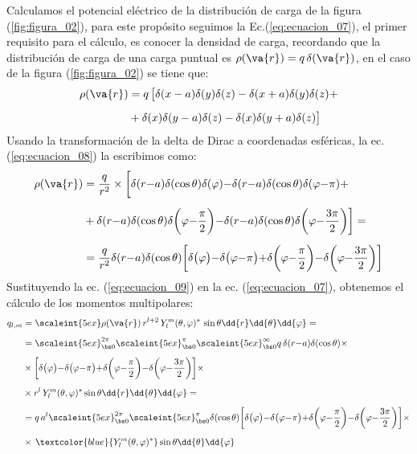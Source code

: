 Calculamos el potencial eléctrico de la distribución de carga de la figura (\ref{fig:figura_02}), para este propósito seguimos la Ec.(\ref{eq:ecuacion_07}), el primer requisito para el cálculo, es conocer la densidad de carga, recordando que la distribución de carga de una carga puntual es $\rho (\va{r}) = q \, \delta (\va{r})$, en el caso de la figura (\ref{fig:figura_02}) se tiene que:
\begin{align}
\rho(\va{r}) &= q \, \big[ \delta (x - a) \delta(y) \delta(z) -  \delta (x + a) \delta(y) \delta(z) + \\[0.5em]
&+ \delta (x) \delta(y - a) \delta(z) - \delta (x) \delta(y + a) \delta(z) \big]
\label{eq:ecuacion_08}
\end{align}
Usando la transformación de la delta de Dirac a coordenadas esféricas, la ec. (\ref{eq:ecuacion_08}) la escribimos como:
\begin{align}
\begin{aligned}[b]
\rho(\va{r}) &= \dfrac{q}{r^{2}} \times \bigg[ \delta(r {-} a) \delta(\cos \theta) \delta(\varphi) {-} \delta(r {-} a) \delta(\cos \theta) \delta(\varphi {-} \pi) + \\[0.5em]
&+ \delta(r {-} a) \delta(\cos \theta) \delta \bigg(\varphi {-} \dfrac{\pi}{2} \bigg) {-} \delta(r {-} a) \delta(\cos \theta) \delta \bigg( \varphi {-} \dfrac{3 \pi}{2} \bigg) \bigg] = \\[0.5em]
&= \dfrac{q}{r^{2}} \delta(r {-} a) \delta(\cos \theta) \bigg[ \delta \big(\varphi \big) {-} \delta \big(\varphi {-} \pi \big) {+} \delta \bigg( \varphi {-} \dfrac{\pi}{2} \bigg) {-} \delta \bigg(\varphi {-} \dfrac{3 \pi}{2} \bigg) \bigg]
\end{aligned}
\label{eq:ecuacion_09}
\end{align}
Sustituyendo la ec. (\ref{eq:ecuacion_09}) en la ec. (\ref{eq:ecuacion_07}), obtenemos el cálculo de los momentos multipolares:
\begin{align}
\begin{aligned}[b]
q_{l,m} &= \scaleint{5ex} \rho (\va{r}) \, r^{l+2} \, Y_{l}^{m} (\theta, \varphi)^{*} \, \sin \theta \dd{r} \dd{\theta} \dd{\varphi} = \\[0.5em]
&= \scaleint{5ex}_{\bs 0}^{2 \pi} \scaleint{5ex}_{\bs 0}^{\pi} \scaleint{5ex}_{\bs 0}^{\infty} q \, \delta(r {-} a) \delta(\cos \theta) \times \\[0.5em]
&\times \bigg[ \delta \big(\varphi \big) {-} \delta \big(\varphi {-} \pi \big) {+} \delta \bigg( \varphi {-} \dfrac{\pi}{2} \bigg) {-} \delta \bigg(\varphi {-} \dfrac{3 \pi}{2} \bigg) \bigg] \times \\[0.5em]
&\times r^{l} \, Y_{l}^{m} (\theta, \varphi)^{*} \sin \theta \dd{r} \dd{\theta} \dd{\varphi} = \\[0.5em]
&= q \, a^{l} \scaleint{5ex}_{\bs 0}^{2 \pi} \scaleint{5ex}_{\bs 0}^{\pi} \delta(\cos \theta) \bigg[ \delta \big(\varphi \big) {-} \delta \big(\varphi {-} \pi \big) {+} \delta \bigg( \varphi {-} \dfrac{\pi}{2} \bigg) {-} \delta \bigg(\varphi {-} \dfrac{3 \pi}{2} \bigg) \bigg] \times \\[0.5em]
&\times \, \textcolor{blue}{Y_{l}^{m} (\theta, \varphi)^{*}} \sin \theta \dd{\theta} \dd{\varphi}
\end{aligned}
\label{eq:ecuacion_10}
\end{align}
